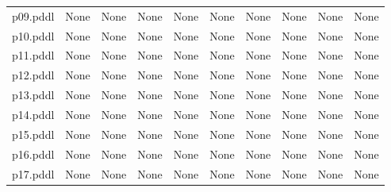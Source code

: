 \documentclass{article}
\begin{document}
\begin{tabular}{@{}lrrrrrrrrr@{}}
p09.pddl & \multicolumn{1}{|l|}{None} & \multicolumn{1}{|l|}{None} & \multicolumn{1}{|l|}{None} & \multicolumn{1}{|l|}{None} & \multicolumn{1}{|l|}{None} & \multicolumn{1}{|l|}{None} & \multicolumn{1}{|l|}{None} & \multicolumn{1}{|l|}{None} & \multicolumn{1}{|l|}{None} \\
p10.pddl & \multicolumn{1}{|l|}{None} & \multicolumn{1}{|l|}{None} & \multicolumn{1}{|l|}{None} & \multicolumn{1}{|l|}{None} & \multicolumn{1}{|l|}{None} & \multicolumn{1}{|l|}{None} & \multicolumn{1}{|l|}{None} & \multicolumn{1}{|l|}{None} & \multicolumn{1}{|l|}{None} \\
p11.pddl & \multicolumn{1}{|l|}{None} & \multicolumn{1}{|l|}{None} & \multicolumn{1}{|l|}{None} & \multicolumn{1}{|l|}{None} & \multicolumn{1}{|l|}{None} & \multicolumn{1}{|l|}{None} & \multicolumn{1}{|l|}{None} & \multicolumn{1}{|l|}{None} & \multicolumn{1}{|l|}{None} \\
p12.pddl & \multicolumn{1}{|l|}{None} & \multicolumn{1}{|l|}{None} & \multicolumn{1}{|l|}{None} & \multicolumn{1}{|l|}{None} & \multicolumn{1}{|l|}{None} & \multicolumn{1}{|l|}{None} & \multicolumn{1}{|l|}{None} & \multicolumn{1}{|l|}{None} & \multicolumn{1}{|l|}{None} \\
p13.pddl & \multicolumn{1}{|l|}{None} & \multicolumn{1}{|l|}{None} & \multicolumn{1}{|l|}{None} & \multicolumn{1}{|l|}{None} & \multicolumn{1}{|l|}{None} & \multicolumn{1}{|l|}{None} & \multicolumn{1}{|l|}{None} & \multicolumn{1}{|l|}{None} & \multicolumn{1}{|l|}{None} \\
p14.pddl & \multicolumn{1}{|l|}{None} & \multicolumn{1}{|l|}{None} & \multicolumn{1}{|l|}{None} & \multicolumn{1}{|l|}{None} & \multicolumn{1}{|l|}{None} & \multicolumn{1}{|l|}{None} & \multicolumn{1}{|l|}{None} & \multicolumn{1}{|l|}{None} & \multicolumn{1}{|l|}{None} \\
p15.pddl & \multicolumn{1}{|l|}{None} & \multicolumn{1}{|l|}{None} & \multicolumn{1}{|l|}{None} & \multicolumn{1}{|l|}{None} & \multicolumn{1}{|l|}{None} & \multicolumn{1}{|l|}{None} & \multicolumn{1}{|l|}{None} & \multicolumn{1}{|l|}{None} & \multicolumn{1}{|l|}{None} \\
p16.pddl & \multicolumn{1}{|l|}{None} & \multicolumn{1}{|l|}{None} & \multicolumn{1}{|l|}{None} & \multicolumn{1}{|l|}{None} & \multicolumn{1}{|l|}{None} & \multicolumn{1}{|l|}{None} & \multicolumn{1}{|l|}{None} & \multicolumn{1}{|l|}{None} & \multicolumn{1}{|l|}{None} \\
p17.pddl & \multicolumn{1}{|l|}{None} & \multicolumn{1}{|l|}{None} & \multicolumn{1}{|l|}{None} & \multicolumn{1}{|l|}{None} & \multicolumn{1}{|l|}{None} & \multicolumn{1}{|l|}{None} & \multicolumn{1}{|l|}{None} & \multicolumn{1}{|l|}{None} & \multicolumn{1}{|l|}{None} \\

\end{tabular}
\end{document}

